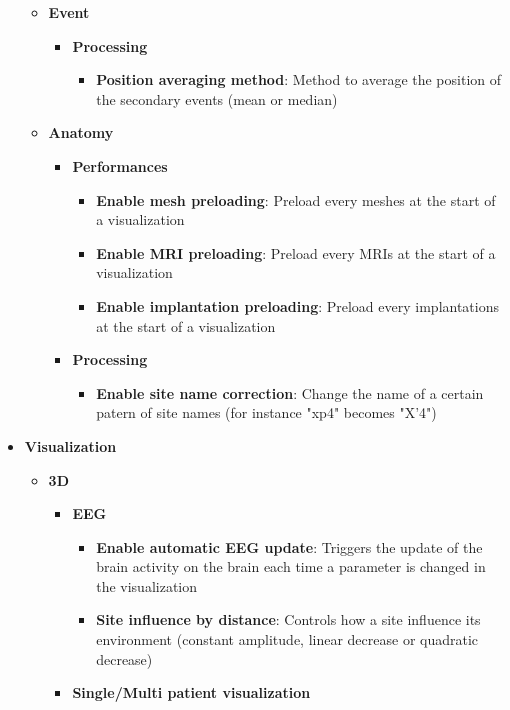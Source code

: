 \documentclass[a4paper]{article}
\begin{document}
\begin{itemize}
\begin{itemize}
\begin{itemize}
\begin{itemize}
\end{itemize}
\end{itemize}
\item \textbf{Event}
\begin{itemize}
\item \textbf{Processing}
\begin{itemize}
\item \textbf{Position averaging method}: Method to average the position of the secondary events (mean or median)
\end{itemize}
\end{itemize}
\item \textbf{Anatomy}
\begin{itemize}
\item \textbf{Performances}
\begin{itemize}
\item \textbf{Enable mesh preloading}: Preload every meshes at the start of a visualization
\item \textbf{Enable MRI preloading}: Preload every MRIs at the start of a visualization
\item \textbf{Enable implantation preloading}: Preload every implantations at the start of a visualization
\end{itemize}
\item \textbf{Processing}
\begin{itemize}
\item \textbf{Enable site name correction}: Change the name of a certain patern of site names (for instance "xp4" becomes "X'4")
\end{itemize}
\end{itemize}
\end{itemize}
\item \textbf{Visualization}
\begin{itemize}
\item \textbf{3D}
\begin{itemize}
\item \textbf{EEG}
\begin{itemize}
\item \textbf{Enable automatic EEG update}: Triggers the update of the brain activity on the brain each time a parameter is changed in the visualization
\item \textbf{Site influence by distance}: Controls how a site influence its environment (constant amplitude, linear decrease or quadratic decrease)
\end{itemize}
\item \textbf{Single/Multi patient visualization}

\end{itemize}
\end{itemize}
\end{itemize}
\end{document}

